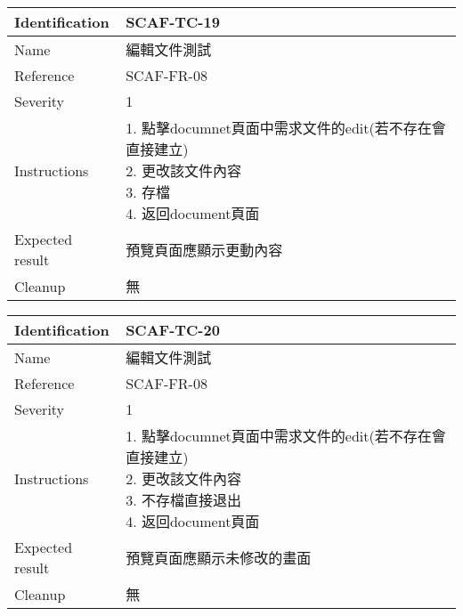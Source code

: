 \documentclass{report}
\begin{document}
\begin{tabularx}{0.9\textwidth}{
  |p{}%
  |p{}|%
  }
  \hline
  \centering Identification &  SCAF-TC-19 \\
  \hline
  \centering Name & 編輯文件測試 \\
  \hline
  \centering Reference & SCAF-FR-08 \\
  \hline
  \centering Severity & 1 \\
  \hline
  \centering Instructions & 
  \makecell{
    1. 點擊documnet頁面中需求文件的edit(若不存在會直接建立) \\
    2. 更改該文件內容  \\
    3. 存檔  \\
    4. 返回document頁面
  }\\
  \hline
  \centering Expected result & 預覽頁面應顯示更動內容 \\
  \hline
  \centering Cleanup & 無 \\
  \hline
\end{tabularx}
\newline\newline

\begin{tabularx}{0.9\textwidth}{
  |p{}%
  |p{}|%
  }
  \hline
  \centering Identification &  SCAF-TC-20 \\
  \hline
  \centering Name & 編輯文件測試 \\
  \hline
  \centering Reference & SCAF-FR-08 \\
  \hline
  \centering Severity & 1 \\
  \hline
  \centering Instructions & 
  \makecell{
    1. 點擊documnet頁面中需求文件的edit(若不存在會直接建立) \\
    2. 更改該文件內容  \\
    3. 不存檔直接退出  \\
    4. 返回document頁面
  }\\
  \hline
  \centering Expected result & 預覽頁面應顯示未修改的畫面 \\
  \hline
  \centering Cleanup & 無 \\
  \hline
\end{tabularx}
\newline\newline
\end{document}

